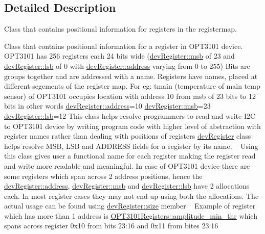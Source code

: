 \subsection{Detailed Description}
Class that contains positional information for registers in the registermap. 

Class that contains positional information for a register in O\+P\+T3101 device. O\+P\+T3101 has 256 registers each 24 bits wide (\mbox{\hyperlink{classdev_register_a217b3d5b947f4c596bcdfb4ec175790f}{dev\+Register\+::msb}} of 23 and \mbox{\hyperlink{classdev_register_a6908a02139ef85a535848889583e6c12}{dev\+Register\+::lsb}} of 0 with \mbox{\hyperlink{classdev_register_ad16fbe9cd26ba1e6d823141976f756da}{dev\+Register\+::address}} varying from 0 to 255) Bits are groups together and are addressed with a name. Registers have names, placed at different segements of the register map. For eg\+: tmain (temperature of main temp sensor) of O\+P\+T3101 occupies location with address 10 from msb of 23 bits to 12 bits in other words \mbox{\hyperlink{classdev_register_ad16fbe9cd26ba1e6d823141976f756da}{dev\+Register\+::address}}=10 \mbox{\hyperlink{classdev_register_a217b3d5b947f4c596bcdfb4ec175790f}{dev\+Register\+::msb}}=23 \mbox{\hyperlink{classdev_register_a6908a02139ef85a535848889583e6c12}{dev\+Register\+::lsb}}=12 This class helps resolve programmers to read and write I2C to O\+P\+T3101 device by writing program code with higher level of abstraction with register names rather than dealing with positions of registers \mbox{\hyperlink{classdev_register}{dev\+Register}} class helps resolve M\+SB, L\+SB and A\+D\+D\+R\+E\+SS fields for a register by its name. ~\newline
Using this class gives user a functional name for each register making the register read and write more readable and meaningful. In case of O\+P\+T3101 device there are some registers which span across 2 address positions, hence the \mbox{\hyperlink{classdev_register_ad16fbe9cd26ba1e6d823141976f756da}{dev\+Register\+::address}}, \mbox{\hyperlink{classdev_register_a217b3d5b947f4c596bcdfb4ec175790f}{dev\+Register\+::msb}} and \mbox{\hyperlink{classdev_register_a6908a02139ef85a535848889583e6c12}{dev\+Register\+::lsb}} have 2 allocations each. In most register cases they may not end up using both the allocations. The actual usage can be found using \mbox{\hyperlink{classdev_register_a6596e86ccbcd857febb5c28bc03aa480}{dev\+Register\+::size}} member ~\newline
 Example of register which has more than 1 address is \mbox{\hyperlink{class_o_p_t3101_registers_a7b68f2c8301673bf2329bf3d1c2068d7}{O\+P\+T3101\+Registers\+::amplitude\+\_\+min\+\_\+thr}} which spans across register 0x10 from bits 23\+:16 and 0x11 from bites 23\+:16 

